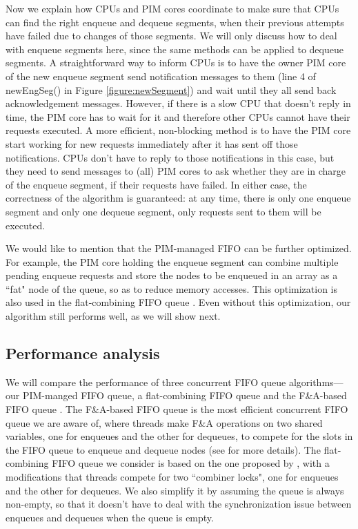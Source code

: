Now we explain how CPUs and PIM cores coordinate to make sure that CPUs can find the right enqueue 
and dequeue segments, when their previous attempts have failed due to changes of those segments. 
We will only discuss how to deal with enqueue segments here, 
since the same methods can be applied to dequeue segments. 
A straightforward way to inform CPUs is to have the owner PIM core of the new enqueue segment 
send notification messages to them (line 4 of newEngSeg() in Figure \ref{figure:newSegment}) 
and wait until they all send back acknowledgement messages. 
However, if there is a slow CPU that doesn't reply in time, 
the PIM core has to wait for it and therefore other CPUs cannot have their requests executed. 
A more efficient, non-blocking method is to have the PIM core start working for new requests 
immediately after it has sent off those notifications. 
CPUs don't have to reply to those notifications in this case, but they need to send messages 
to (all) PIM cores to ask whether they are in charge of the enqueue segment, 
if their requests have failed.
In either case, the correctness of the algorithm is guaranteed:  
at any time, there is only one enqueue segment and only one dequeue segment, 
only requests sent to them will be executed. 
  
We would like to mention that the PIM-managed FIFO can be further optimized. 
For example, the PIM core holding the enqueue segment can combine multiple pending enqueue requests 
and store the nodes to be enqueued in an array as a ``fat" node of the queue, 
so as to reduce memory accesses. 
This optimization is also used in the flat-combining FIFO queue \cite{Hendler10}. 
Even without this optimization, our algorithm still performs well, as we will show next. 

\subsection{Performance analysis}
We will compare the performance of three concurrent FIFO queue algorithms---our PIM-manged FIFO queue, 
a flat-combining FIFO queue and the F\&A-based FIFO queue \cite{Morrison13}. 
The F\&A-based FIFO queue is the most efficient concurrent FIFO queue we are aware of, 
where threads make F\&A operations on two shared variables, 
one for enqueues and the other for dequeues, to compete for the slots in the FIFO queue to 
enqueue and dequeue nodes (see \cite{Morrison13} for more details). 
The flat-combining FIFO queue we consider is based on the one proposed by \cite{Hendler10}, 
with a modifications that threads compete for two ``combiner locks", 
one for enqueues and the other for dequeues. 
We also simplify it by assuming the queue is always non-empty, so that it doesn't have to deal with 
the synchronization issue between enqueues and dequeues when the queue is empty. 

